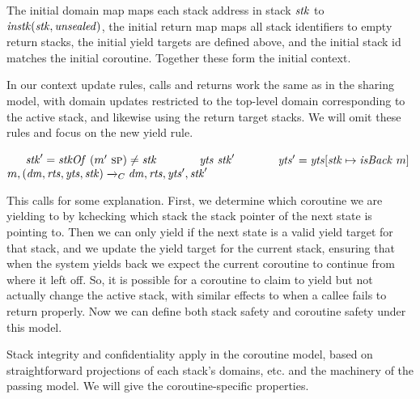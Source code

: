 \documentclass[acmsmall,review,anonymous]{acmart}\settopmatter{printfolios=true,printccs=false,printacmref=false}
\begin{document}
{The initial domain map maps each stack address in stack \(\mathit{stk}\) to
\(\mathit{instk}(\mathit{stk},\mathit{unsealed})\), the initial return map maps all stack identifiers to empty
return stacks, the initial yield targets are defined above, and the initial stack id matches the initial
coroutine. Together these form the initial context.

In our context update rules, calls and returns work the same as in the sharing model,
with domain updates restricted to the top-level domain corresponding to the active stack,
and likewise using the return target stacks. We will omit these rules and focus on the new yield rule.

             {~ ~ \(\mathit{stk}' = \mathit{stkOf} ~ (m'~ \textsc{sp}) \not = \mathit{stk}\) ~ ~}
             {~ ~ \(\mathit{yts} ~ \mathit{stk}'\) ~ ~}
             {~ ~ \(\mathit{yts}' = \mathit{yts}[\mathit{stk} \mapsto \mathit{isBack} ~ m]\)}
             {\(m,(\mathit{dm},\mathit{rts},\mathit{yts},\mathit{stk}) \xrightarrow{}_C \mathit{dm},\mathit{rts},\mathit{yts}',\mathit{stk}'\)}

This calls for some explanation. First, we determine which coroutine we are yielding to by
kchecking which stack the stack pointer of the next state is pointing to. Then we can only yield
if the next state is a valid yield target for that stack, and we update the yield target for
the current stack, ensuring that when the system yields back we expect the current coroutine
to continue from where it left off. So, it is possible for a coroutine to claim to yield
but not actually change the active stack, with similar effects to when a callee fails
to return properly. Now we can define both stack safety and coroutine safety under this model.

Stack integrity and confidentiality apply in the coroutine model, based on straightforward
projections of each stack's domains, etc. and the machinery of the passing model. We will give
the coroutine-specific properties.



}
\end{document}
